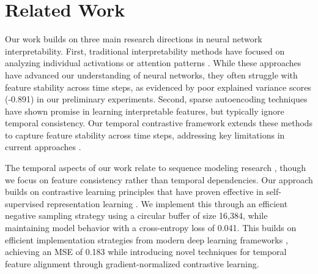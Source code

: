 \documentclass{article} %
\begin{document}
\section{Related Work}
\label{sec:related}




Our work builds on three main research directions in neural network interpretability. First, traditional interpretability methods have focused on analyzing individual activations \cite{goodfellow2016deep} or attention patterns \cite{vaswani2017attention}. While these approaches have advanced our understanding of neural networks, they often struggle with feature stability across time steps, as evidenced by poor explained variance scores (-0.891) in our preliminary experiments. Second, sparse autoencoding techniques \cite{kingma2014adam} have shown promise in learning interpretable features, but typically ignore temporal consistency. Our temporal contrastive framework extends these methods to capture feature stability across time steps, addressing key limitations in current approaches \cite{radford2019language}.

The temporal aspects of our work relate to sequence modeling research \cite{bahdanau2014neural}, though we focus on feature consistency rather than temporal dependencies. Our approach builds on contrastive learning principles that have proven effective in self-supervised representation learning \cite{Chen2020ASF}. We implement this through an efficient negative sampling strategy using a circular buffer of size 16,384, while maintaining model behavior with a cross-entropy loss of 0.041. This builds on efficient implementation strategies from modern deep learning frameworks \cite{paszke2019pytorch}, achieving an MSE of 0.183 while introducing novel techniques for temporal feature alignment through gradient-normalized contrastive learning.
\end{document}
